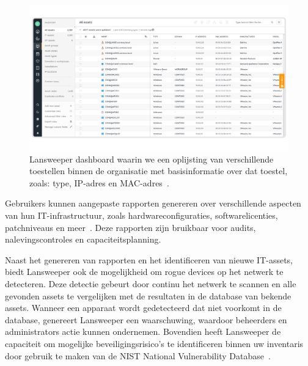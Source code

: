 \begin{figure}[h!]
    \includegraphics[width=\textwidth]
    {./graphics/lansweeper-dashboard.png}
    \caption{\label{fig:lansweeper-dashboard}Lansweeper dashboard waarin we een oplijsting van verschillende toestellen binnen de organisatie met basisinformatie over dat toestel, zoals: type, IP-adres en MAC-adres~\autocite{lansweeper-dashboard}.}
\end{figure}

Gebruikers kunnen aangepaste rapporten genereren over verschillende aspecten van hun IT-infrastructuur, zoals hardwareconfiguraties, softwarelicenties, patchniveaus en meer~\autocite{lansweeper-features}.
Deze rapporten zijn bruikbaar voor audits, nalevingscontroles en capaciteitsplanning.

Naast het genereren van rapporten en het identificeren van nieuwe IT-assets, biedt Lansweeper ook de mogelijkheid om rogue devices op het netwerk te detecteren.
Deze detectie gebeurt door continu het netwerk te scannen en alle gevonden assets te vergelijken met de resultaten in de database van bekende assets.
Wanneer een apparaat wordt gedetecteerd dat niet voorkomt in de database, genereert Lansweeper een waarschuwing, waardoor beheerders en administrators actie kunnen ondernemen.
Bovendien heeft Lansweeper de capaciteit om mogelijke beveiligingsrisico's te identificeren binnen uw inventaris door gebruik te maken van de NIST National Vulnerability Database~\autocite{lansweeper-cam}.
